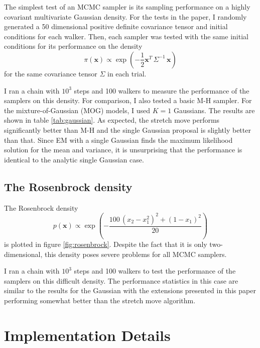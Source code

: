 \documentclass[12pt,preprint]{aastex}
\newcommand{\fig}[1]{figure \ref{fig:#1}}
\newcommand{\tab}[1]{table \ref{tab:#1}}
\begin{document}
The simplest test of an MCMC sampler is its sampling performance on a highly covariant
multivariate Gaussian density. For the tests in the paper, I randomly generated
a 50 dimensional positive definite covariance tensor and initial conditions for each
walker.  Then, each sampler was tested with the same initial conditions for its
performance on the density
\begin{equation}
    \pi (\mathbf{x}) \propto \exp\left ( -\frac{1}{2} \mathbf{x}^T \, \Sigma^{-1} \, \mathbf{x} \right )
\end{equation}
for the same covariance tensor $\Sigma$ in each trial.

I ran a chain with $10^3$ steps and 100 walkers to measure the performance of the
samplers on this density. For comparison, I also tested a basic M-H sampler. For
the mixture-of-Gaussian (MOG) models, I used $K = 1$ Gaussians. The
results are shown in \tab{gaussian}. As expected, the stretch move performs
significantly better than M-H and the single Gaussian proposal is slightly better
than that. Since EM with a single Gaussian finds the maximum likelihood solution
for the mean and variance, it is unsurprising that the performance is identical
to the analytic single Gaussian case.

\subsection{The Rosenbrock density}

The Rosenbrock density
\begin{equation}
    p(\mathbf{x}) \propto \exp \left ( -\frac{100 \, (x_2 - x_1^2)^2+ (1-x_1)^2}{20} \right )
\end{equation}
is plotted in \fig{rosenbrock}. Despite the fact that it is only two-dimensional,
this density poses severe problems for all MCMC samplers.

I ran a chain with $10^3$ steps and 100 walkers to test the performance
of the samplers on this difficult density. The performance statistics in this
case are similar to the results for the Gaussian with the extensions presented in
this paper performing somewhat better than the stretch move algorithm.

\section{Implementation Details}
\end{document}
